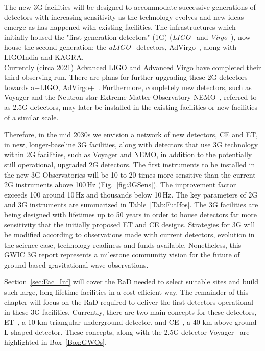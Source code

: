 The new \ac{3G} facilities will be designed to accommodate successive generations of detectors with increasing sensitivity as the technology evolves and new ideas emerge as has happened with existing facilities. The infrastructures which initially housed the "first generation detectors" (\acs{1G}) (\textit{\acs{LIGO}}~\cite{Abbott2009} and \textit{\acs{Virgo}}~\cite{VirgoStatus2008}), now house the second generation: the \textit{\acs{aLIGO}}~\cite{AdvancedLIGO2015} detectors, \acs{AdVirgo}~\cite{AdvancedVirgo2015}, along with \acs{LIGOIndia} and \acs{KAGRA}. \\
Currently (circa 2021)  Advanced LIGO and Advanced Virgo have completed  their third observing run. There are plans for further upgrading these 2G detectors towards \acs{a+LIGO}, \acs{AdVirgo+}~\cite{Zucker:LIGOAplus, Cagnoli:VirgoAplus}.  Furthermore, completely new detectors, such as  \acs{Voyager} \cite{VoyagerDCC2018} and the Neutron star Extreme Matter Observatory \acs{NEMO}~\cite{NEMO2020}, referred to as  \acs{2.5G}  detectors, may later be installed in the existing facilities or new facilities of a similar scale.

Therefore, in the mid 2030s we envision a network of new detectors, \ac{CE} and \ac{ET}, in new, longer-baseline \ac{3G} facilities, along with detectors that use \ac{3G} technology within \ac{2G} facilities, such as \ac{Voyager} and \ac{NEMO}, in addition to the potentially still operational, upgraded \ac{2G} detectors.
The first instruments to be installed in the new \ac{3G} Observatories will be 10 to 20 times more sensitive than the current \ac{2G} instruments above 100\,Hz (Fig.~\ref{fig:3GSens}). The improvement factor exceeds 100 around 10\,Hz and thousands below 10\,Hz. The key parameters of \ac{2G} and \ac{3G} instruments are summarized in Table~\ref{Tab:FutIfos}. The \ac{3G} facilities are being designed with lifetimes up to 50 years in order to house detectors far more sensitivity that the initially  proposed ET and CE  designs.  Strategies for \ac{3G} will be modified according to observations made with current detectors, evolution in the science case, technology readiness and funds available. Nonetheless, this \acs{GWIC} \ac{3G} report represents a milestone community vision for the future of ground based gravitational wave observations. 

 Section~\ref{sec:Fac_Inf} will cover the \ac{RaD} needed to select suitable sites and build such large, long-lifetime facilities in a cost efficient way. The remainder of this chapter will focus on the \ac{RaD} required to deliver the first detectors operational in these \ac{3G} facilities.  Currently, there are two main concepts for these detectors, \acf{ET}~\cite{ET2011}, a 10-km triangular underground detector, and \acf{CE}~\cite{CosmicExplorer2017}, a 40-km above-ground L-shaped detector. These concepts, along with the \ac{2.5G}  detector \ac{Voyager}~\cite{Voyager:Inst,VoyagerDCC2018} are highlighted in Box~\ref{Box:GWOs}.

